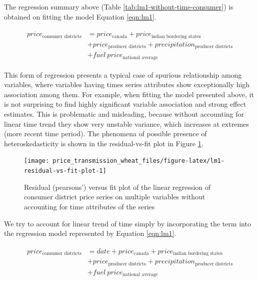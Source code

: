 \documentclass[12pt,]{article}
\begin{document}
The regression summary above (Table \ref{tab:lm1-without-time-consumer}) is obtained on fitting the model Equation \ref{eqn:lm1}.

\begin{equation}
\label{eqn:lm1}
\begin{aligned}
\begin{split}
price_{\textrm{consumer districts}} &= price_{\textrm{canada}} + price_{\textrm{indian bordering states}} \\ &+
price_{\textrm{producer districts}} + precipitation_{\textrm{producer districts}} \\ &+ fuel~price_{\textrm{national average}}
\end{split}
\end{aligned}
\end{equation}

This form of regression presents a typical case of spurious relationship among variables, where variables having times series attributes show exceptionally high association among them. For example, when fitting the model presented above, it is not surprising to find highly significant variable association and strong effect estimates. This is problematic and misleading, because without accounting for linear time trend they show very unstable variance, which increases at extremes (more recent time period). The phenomena of possible presence of heteroskedasticity is shown in the residual-vs-fit plot in Figure \ref{fig:lm1-residual-vs-fit-plot}.

\begin{figure}

{\centering \texttt{[image: price\_transmission\_wheat\_files/figure-latex/lm1-residual-vs-fit-plot-1]} 

}

\caption{Residual (pearsons') versus fit plot of the linear regression of consumer district price series on multiple variables without accounting for time attributes of the series}\label{fig:lm1-residual-vs-fit-plot}
\end{figure}

We try to account for linear trend of time simply by incorporating the term into the regression model represented by Equation \ref{eqn:lm1}.

\begin{equation}
\label{eqn:lm2}
\begin{aligned}
\begin{split}
price_{\textrm{consumer districts}} &= date + price_{\textrm{canada}} + price_{\textrm{indian bordering states}} \\ &+
price_{\textrm{producer districts}} + precipitation_{\textrm{producer districts}} \\ &+ fuel~price_{\textrm{national average}}
\end{split}
\end{aligned}
\end{equation}
\end{document}
